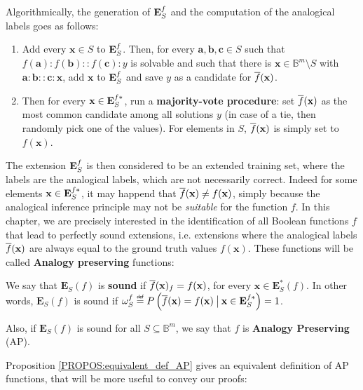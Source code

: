 Algorithmically, the generation of $\mathbf{E}_{S}^{f}$ and the computation of the
analogical labels goes as follows:
\begin{enumerate}
  \item Add every $\mathbf{x} \in S$ to $\mathbf{E}_{S}^{f}$. Then, for every
    $\mathbf{a},\mathbf{b},\mathbf{c} \in S$ such that $f(\mathbf{a}) :
    f(\mathbf{b}) :: f(\mathbf{c}) : y$ is solvable and such that there is
    $\mathbf{x} \in \mathbb{B}^m \setminus S$ with $\mathbf{a} : \mathbf{b} ::
    \mathbf{c} : \mathbf{x}$, add $\mathbf{x}$ to $\mathbf{E}_{S}^{f}$ and save
    $y$ as a candidate for $\overline{f}(\mathbf{x})$.
\item Then for every $\mathbf{x} \in \mathbf{E}_{S}^{f*}$, run a
  \textbf{majority-vote procedure}: set $\overline{f}(\mathbf{x})$ as the most
    common candidate among all solutions $y$ (in case of a tie, then randomly
    pick one of the values). For elements in $S$, $\overline{f}(\mathbf{x})$ is
    simply set to $f(\mathbf{x})$.
\end{enumerate}

\noindent
The extension $\mathbf{E}_{S}^{f}$ is then considered to be an extended training set, where
the labels are the analogical labels, which are not necessarily correct. Indeed
for some elements $\mathbf{x} \in \mathbf{E}_{S}^{f*}$, it may happend that
$\overline{f}(\mathbf{x}) \neq f(\mathbf{x})$, simply because the analogical inference
principle may not be \textit{suitable} for the function $f$.  In this chapter,
we  are precisely interested in the identification of all Boolean functions $f$
that lead to perfectly sound extensions, i.e.  extensions where the analogical
labels $\overline{f}(\mathbf{x})$ are always equal to the ground truth values
$f(\mathbf{x})$. These functions will be called \textbf{Analogy preserving}
functions:

\begin{definition}
  We say that $\mathbf{E}_S(f)$ is {\bf sound} if
  $\overline{f}(\mathbf{x})_f=f(\mathbf{x})$, for every $\mathbf{x} \in
  \mathbf{E}^*_S(f)$. In other words, $\mathbf{E}_S(f)$ is sound if $\omegasf
  \eqdef P\left(\albl{\mathbf{x}} = f(\mathbf{x}) \given[\big] \mathbf{x} \in
  \esfs\right) = 1$.

  \noindent
  Also, if $\mathbf{E}_S(f)$ is sound for all $S \subseteq
  \mathbb{B}^m$, we say that $f$ is {\bf Analogy Preserving} (AP).
\end{definition}

\noindent
Proposition \ref{PROPOS:equivalent_def_AP} gives an equivalent definition of AP
functions, that will be more useful to convey our proofs:

